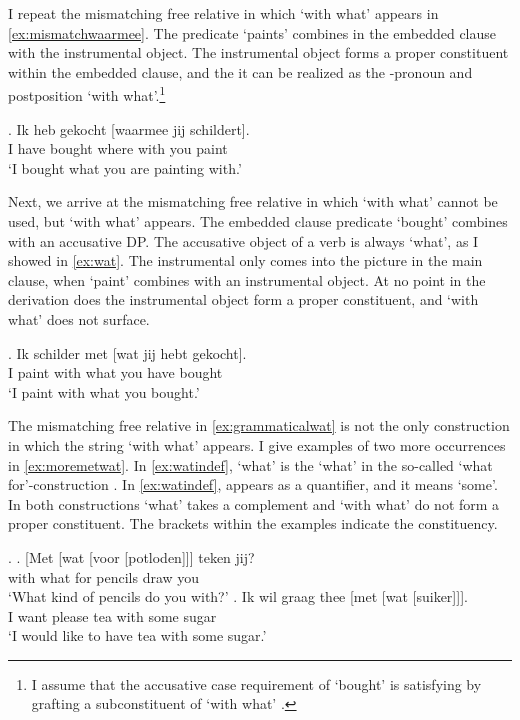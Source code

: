 \documentclass[12pt]{article}
\begin{document}
I repeat the mismatching free relative in which  `with what' appears in \ref{ex:mismatchwaarmee}. The predicate  `paints' combines in the embedded clause with the instrumental object. The instrumental object forms a proper constituent within the embedded clause, and the it can be realized as the -pronoun and postposition  `with what'.\footnote{I assume that the accusative case requirement of  `bought' is satisfying by grafting a subconstituent of  `with what' \citep{bergsma2019}.}

\exg. Ik heb gekocht [waarmee jij schildert].\\
 I have bought {where with} you paint\\
 `I bought what you are painting with.'\label{ex:mismatchwaarmee}

Next, we arrive at the mismatching free relative in which  `with what' cannot be used, but  `with what' appears. The embedded clause predicate  `bought' combines with an accusative DP. The accusative object of a verb is always  `what', as I showed in \ref{ex:wat}. The instrumental only comes into the picture in the main clause, when  `paint' combines with an instrumental object. At no point in the derivation does the instrumental object form a proper constituent, and  `with what' does not surface.

\exg. Ik schilder met [wat jij hebt gekocht].\\
 I paint with what you have bought\\
 `I paint with what you bought.'\label{ex:mismatchmetwat}

 The mismatching free relative in \ref{ex:grammaticalwat} is not the only construction in which the string  `with what' appears. I give examples of two more occurrences in \ref{ex:moremetwat}. In \ref{ex:watindef},  `what' is the  `what' in the so-called  `what for'-construction \citep[cf.][]{corver1991}.
 In \ref{ex:watindef},  appears as a quantifier, and it means `some'. In both constructions  `what' takes a complement and  `with what' do not form a proper constituent. The brackets within the examples indicate the constituency.

 \ex.\label{ex:moremetwat}
 \ag. [Met [wat [voor [potloden]]] teken jij?\\
  with what for pencils draw you\\
  `What kind of pencils do you with?'\label{ex:watwasfur}
 \bg. Ik wil graag thee [met [wat [suiker]]].\\
  I want please tea with some sugar\\
  `I would like to have tea with some sugar.'\label{ex:watindef}
\end{document}
